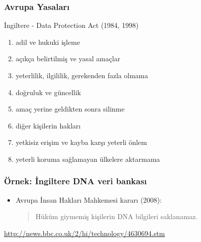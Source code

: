 \documentclass[dvipsnames]{beamer}
\theoremstyle{definition}
\theoremstyle{example}
\theoremstyle{plain}
\begin{document}
\begin{frame}
  \frametitle{Avrupa Yasaları}

  \begin{block}{İngiltere - Data Protection Act (1984, 1998)}
    \begin{enumerate}
      \item adil ve hukuki işleme
      \item açıkça belirtilmiş ve yasal amaçlar
      \item yeterlilik, ilgililik, gerekenden fazla olmama
      \item doğruluk ve güncellik
      \item amaç yerine geldikten sonra silinme
      \item diğer kişilerin hakları
      \item yetkisiz erişim ve kayba karşı yeterli önlem
      \item yeterli koruma sağlamayan ülkelere aktarmama
    \end{enumerate}
  \end{block}
\end{frame}

\begin{frame}
  \frametitle{Örnek: İngiltere DNA veri bankası}

  \begin{center}
  \end{center}

  \begin{itemize}
    \item Avrupa İnsan Hakları Mahkemesi kararı (2008):
    \begin{quote}
      Hüküm giymemiş kişilerin DNA bilgileri saklanamaz.
    \end{quote}
  \end{itemize}

  \medskip
  \tiny{\url{http://news.bbc.co.uk/2/hi/technology/4630694.stm}}\\
\end{frame}
\end{document}
